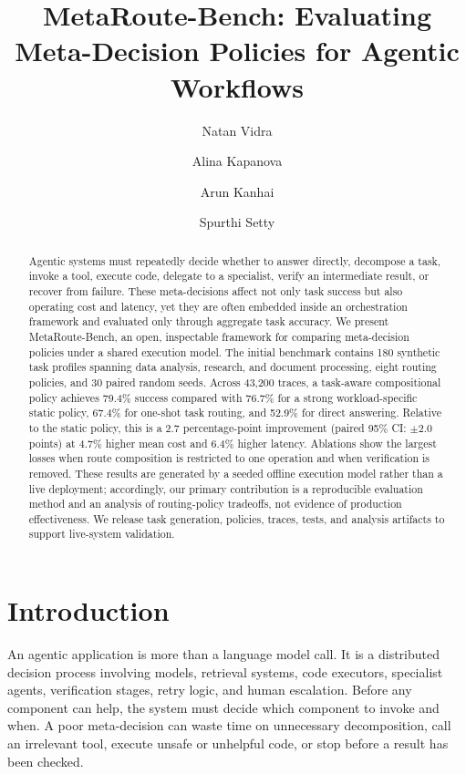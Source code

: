 \documentclass[sigconf]{acmart}
\title{MetaRoute-Bench: Evaluating Meta-Decision Policies for Agentic Workflows}
\author{Natan Vidra}
\affiliation{%
  \institution{Anote AI}
  \city{New York}
  \country{United States}}
\author{Alina Kapanova}
\affiliation{%
  \institution{Anote AI, Cornell University}
  \city{New York}
  \country{United States}}
\author{Arun Kanhai}
\affiliation{%
  \institution{Anote AI, CUNY}
  \city{New York}
  \country{United States}}
\author{Spurthi Setty}
\affiliation{%
  \institution{Stevens Institute of Technology}
  \city{New York}
  \country{United States}}
\begin{document}
\begin{abstract}
Agentic systems must repeatedly decide whether to answer directly, decompose a task, invoke a tool, execute code, delegate to a specialist, verify an intermediate result, or recover from failure. These meta-decisions affect not only task success but also operating cost and latency, yet they are often embedded inside an orchestration framework and evaluated only through aggregate task accuracy. We present MetaRoute-Bench, an open, inspectable framework for comparing meta-decision policies under a shared execution model. The initial benchmark contains 180 synthetic task profiles spanning data analysis, research, and document processing, eight routing policies, and 30 paired random seeds. Across 43,200 traces, a task-aware compositional policy achieves 79.4\% success compared with 76.7\% for a strong workload-specific static policy, 67.4\% for one-shot task routing, and 52.9\% for direct answering. Relative to the static policy, this is a 2.7 percentage-point improvement (paired 95\% CI: $\pm$2.0 points) at 4.7\% higher mean cost and 6.4\% higher latency. Ablations show the largest losses when route composition is restricted to one operation and when verification is removed. These results are generated by a seeded offline execution model rather than a live deployment; accordingly, our primary contribution is a reproducible evaluation method and an analysis of routing-policy tradeoffs, not evidence of production effectiveness. We release task generation, policies, traces, tests, and analysis artifacts to support live-system validation.
\end{abstract}



\maketitle

\section{Introduction}

An agentic application is more than a language model call. It is a distributed decision process involving models, retrieval systems, code executors, specialist agents, verification stages, retry logic, and human escalation. Before any component can help, the system must decide which component to invoke and when. A poor meta-decision can waste time on unnecessary decomposition, call an irrelevant tool, execute unsafe or unhelpful code, or stop before a result has been checked.
\end{document}
